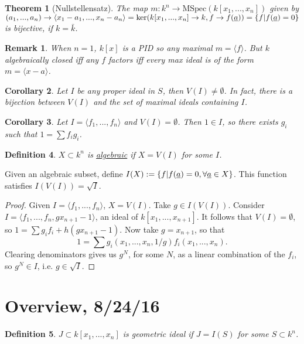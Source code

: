 \documentclass[letterpaper, 12pt]{article}
\newtheorem{rmk}{Remark}
\newtheorem{thm}{Theorem}[subsection]
\newtheorem{cor}[thm]{Corollary}
\newtheorem{definition}[thm]{Definition}
\newcommand{\polyring}[3]{#1[x_{#2}, ..., x_{#3}]}
\newcommand{\mspec}[1]{\mathrm{MSpec}(#1)}
\begin{document}
\begin{thm}[Nullstellensatz]
The map $m : k^n \rightarrow \mspec {\polyring k 1 n}$ given by $(a_1, ..., a_n) \rightarrow \langle x_1 - a_1, ..., x_n - a_n \rangle = \ker(\polyring k 1 n \rightarrow k, f \rightarrow f(\uline{a})) = \{ f | f(\uline{a}) = 0 \}$ is bijective, if $k = \bar{k}$. 
\end{thm}

\begin{rmk}
When $n = 1$, $k[x]$ is a PID so any maximal $m = \langle f \rangle$. But $k$ algebraically closed iff any $f$ factors iff every max ideal is of the form $m = \langle x - a \rangle$. 
\end{rmk}

\begin{cor}
  Let $I$ be any proper ideal in $S$, then $V(I) \neq \emptyset$. In fact, there is a bijection between $V(I)$ and the set of maximal ideals containing $I$.
\end{cor}

\begin{cor}
  Let $I = \langle f_1, ..., f_n \rangle$ and $V(I) = \emptyset$. Then $1 \in I$, so there exists $g_i$ such that $1 = \sum f_i g_i$.
\end{cor}

\begin{definition}
$X \subset k^n$ is \uline{algebraic} if $X = V(I)$ for some $I$.
\end{definition}

Given an algebraic subset, define $I(X) := \{ f | f(\uline{a}) = 0, \forall \uline{a} \in X \}$. This function satisfies $I(V(I)) = \sqrt{I}$. 

\begin{proof}
  Given $I = \langle f_1, ..., f_n \rangle$, $X = V(I)$. Take $g \in I(V(I)).$ Consider $I = \langle f_1, ..., f_n, gx_{n + 1} - 1 \rangle$, an ideal of $\polyring k 1 {n + 1}$. It follows that $V(I) = \emptyset$, so $1 = \sum g_i f_i + h(g x_{n + 1} - 1)$. Now take $g = x_{n + 1}$, so that \[ 1 = \sum g_i(x_1, ..., x_n, 1/g) f_i(x_1, ..., x_n).\] Clearing denominators gives us $g^N$, for some $N$, as a linear combination of the $f_i$, so $g^N \in I$, i.e. $g \in \sqrt{I}$.
\end{proof}

\section{Overview, 8/24/16}

\begin{definition}
  $J \subset \polyring k 1 n$ is geometric ideal if $J = I(S)$ for some $S \subset k^n$.
\end{definition}
\end{document}

